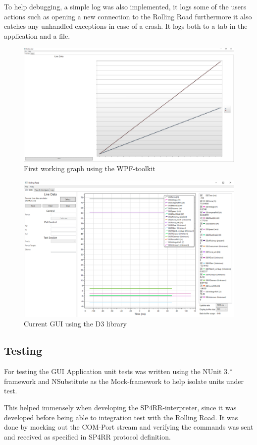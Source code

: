 
To help debugging, a simple log was also implemented, it logs some of the users actions such as opening a new connection to the Rolling Road furthermore it also catches any unhandled exceptions in case of a crash. It logs both to a tab in the application and a file.

\begin{figure}[h!]
\centering
\includegraphics[width=0.7\linewidth]{SubPages/Images/First_GUI}
\caption{First working graph using the WPF-toolkit}
\label{fig:First_GUI}
\end{figure}

\begin{figure}[h!]
\centering
\includegraphics[width=0.7\linewidth]{SubPages/Images/Current_GUI}
\caption{Current GUI using the D3 library}
\label{fig:Current_GUI}
\end{figure}


\subsection{Testing}

For testing the GUI Application unit tests was written using the NUnit 3.* framework and NSubstitute as the Mock-framework to help isolate units under test.

This helped immensely when developing the SP4RR-interpreter, since it was developed before being able to integration test with the Rolling Road. It was done by mocking out the COM-Port stream and verifying the commands was sent and received as specified in SP4RR  protocol definition\cite{RR}.

